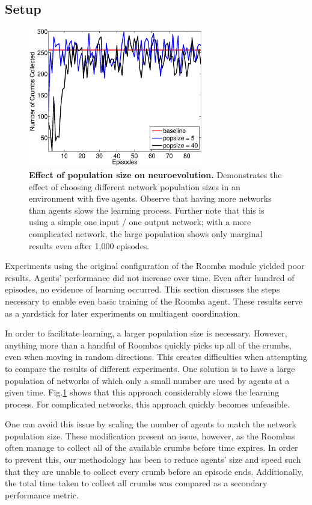 \documentclass[conference]{IEEEtran}
\begin{document}
\subsection{Setup}

\begin{figure}[!t]
\centering
\includegraphics[width=3.0in]{./figures/neroevolution/pop_size.eps}
\caption{\textbf{Effect of population size on neuroevolution.} Demonstrates the effect of choosing different network population sizes in an environment with five agents. Observe that having more networks than agents slows the learning process. Further note that this is using a simple one input / one output network; with a more complicated network, the large population shows only marginal results even after 1,000 episodes.}
\label{neroevolution:pop_size}
\end{figure}

Experiments using the original configuration of the Roomba module yielded poor results. Agents' performance did not increase over time.  Even after hundred of episodes, no evidence of learning occurred. This section discusses the steps necessary to enable even basic training of the Roomba agent. These results serve as a yardstick for later experiments on multiagent coordination.

In order to facilitate learning, a larger population size is necessary. 
However, anything more than a handful of Roombas quickly picks up all of the crumbs, even when moving in random directions. This creates difficulties when attempting to compare the results of different experiments.
One solution is to have a large population of networks of which only a small number are used by agents at a given time. Fig.\ref{neroevolution:pop_size} shows that this approach considerably slows the learning process. For complicated networks, this approach quickly becomes unfeasible.

One can avoid this issue by scaling the number of agents to match the network population size. These modification present an issue, however, as the Roombas often manage to collect all of the available crumbs before time expires. In order to prevent this, our methodology has been to reduce agents' size and speed such that they are unable to collect every crumb before an episode ends. Additionally, the total time taken to collect all crumbs was compared as a secondary performance metric.
\end{document}
